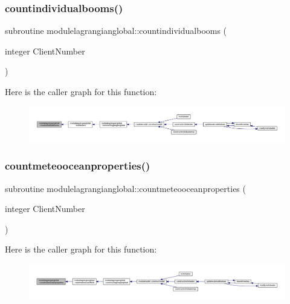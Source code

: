 \subsubsection{\texorpdfstring{countindividualbooms()}{countindividualbooms()}}
{\footnotesize\ttfamily subroutine modulelagrangianglobal\+::countindividualbooms (\begin{DoxyParamCaption}\item[{integer}]{Client\+Number }\end{DoxyParamCaption})\hspace{0.3cm}{\ttfamily [private]}}

Here is the caller graph for this function\+:\nopagebreak
\begin{figure}[H]
\begin{center}
\leavevmode
\includegraphics[width=350pt]{namespacemodulelagrangianglobal_ac2d819c6cb2d9890063752019007589c_icgraph}
\end{center}
\end{figure}
\mbox{\label{namespacemodulelagrangianglobal_ab33bc04ab555b763cd51fa4dac937ccc}} 
\subsubsection{\texorpdfstring{countmeteooceanproperties()}{countmeteooceanproperties()}}
{\footnotesize\ttfamily subroutine modulelagrangianglobal\+::countmeteooceanproperties (\begin{DoxyParamCaption}\item[{integer}]{Client\+Number }\end{DoxyParamCaption})\hspace{0.3cm}{\ttfamily [private]}}

Here is the caller graph for this function\+:\nopagebreak
\begin{figure}[H]
\begin{center}
\leavevmode
\includegraphics[width=350pt]{namespacemodulelagrangianglobal_ab33bc04ab555b763cd51fa4dac937ccc_icgraph}
\end{center}
\end{figure}
\mbox{\label{namespacemodulelagrangianglobal_ad3e36abc135e62fb5fb1583ea3acf79b}} 
